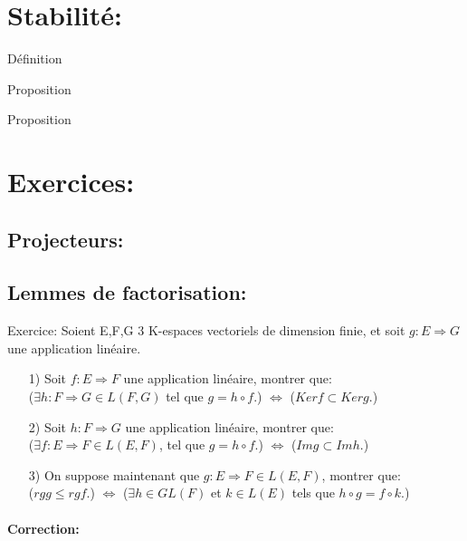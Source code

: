 \documentclass{book}
\begin{document}
\section{Stabilité:}
\begin{Définition}[]{Définition}{}

\end{Définition}
\begin{Propriété}[]{Proposition}{}

\end{Propriété}
\begin{Propriété}[]{Proposition}{}

\end{Propriété}
\section{Exercices:}
\subsection{Projecteurs:}
\subsection{Lemmes de factorisation:}
\begin{Ex}[]{Exercice:}{}
Soient E,F,G 3 K-espaces vectoriels de dimension finie, et soit \(g:E \Rightarrow G\) une application linéaire.
\\ \begin{itemize}
    \item[1)] Soit \(f:E \Rightarrow F\) une application linéaire, montrer que:
    \\ (\( \exists h: F\Rightarrow G \in L(F,G)\)  tel que \(g=h \circ f\).) \(\Leftrightarrow\) (\(Ker f \subset Ker g.\))
    \item[2)] Soit \(h:F \Rightarrow G\) une application linéaire,
    montrer que: 
    \\ (\( \exists f: E\Rightarrow F \in L(E,F)\),  tel que \(g=h \circ f\).) \(\Leftrightarrow\) (\(Im g \subset Im h.\))
    \item[3)] On suppose maintenant que \(g:E \Rightarrow F \in L(E,F)\), montrer que:
    \\ (\(rg g \leq rg f\).) \(\Leftrightarrow\) (\(\exists h \in GL(F)\) et \(k \in L(E)\) tels que \(h \circ g = f \circ k\).)
\end{itemize}
\end{Ex}
\paragraph{Correction:}
\end{document}
